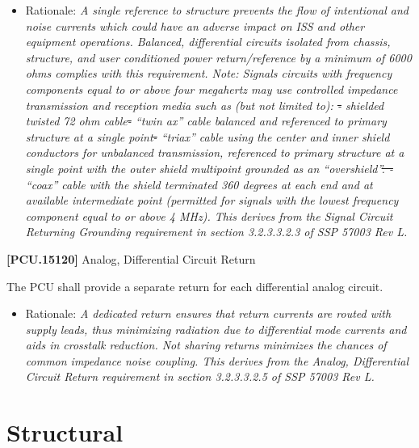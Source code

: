\documentclass[12pt,oneside,oldfontcommands]{memoir}
\providecommand{\DIFaddtex}[1]{{\protect\color{blue}\uwave{#1}}} %
\providecommand{\DIFdeltex}[1]{{\protect\color{red}\sout{#1}}}                      %
\providecommand{\DIFaddbegin}{} %
\providecommand{\DIFaddend}{} %
\providecommand{\DIFdelbegin}{} %
\providecommand{\DIFdelend}{} %
\providecommand{\DIFadd}[1]{\texorpdfstring{\DIFaddtex{#1}}{#1}} %
\providecommand{\DIFdel}[1]{\texorpdfstring{\DIFdeltex{#1}}{}} %
\newcommand{\DIFscaledelfig}{0.5}
\newlength{\DIFdelgraphicswidth} %
\newlength{\DIFdelgraphicsheight} %
\newcommand{\DIFaddincludegraphics}[2][]{{\color{blue}\fbox{\DIFOincludegraphics[#1]{#2}}}} %
\newcommand{\DIFdelincludegraphics}[2][]{%
\sbox{\DIFdelgraphicsbox}{\DIFOincludegraphics[#1]{#2}}%
\settoboxwidth{\DIFdelgraphicswidth}{\DIFdelgraphicsbox} %
\settoboxtotalheight{\DIFdelgraphicsheight}{\DIFdelgraphicsbox} %
\scalebox{\DIFscaledelfig}{%
\parbox[b]{\DIFdelgraphicswidth}{\usebox{\DIFdelgraphicsbox}\\[-\baselineskip] \rule{\DIFdelgraphicswidth}{0em}}\llap{\resizebox{\DIFdelgraphicswidth}{\DIFdelgraphicsheight}{%
\setlength{\unitlength}{\DIFdelgraphicswidth}%
\begin{picture}(1,1)%
\thicklines\linethickness{2pt} %
{\color[rgb]{1,0,0}\put(0,0){\framebox(1,1){}}}%
{\color[rgb]{1,0,0}\put(0,0){\line( 1,1){1}}}%
{\color[rgb]{1,0,0}\put(0,1){\line(1,-1){1}}}%
\end{picture}%
}\hspace*{3pt}}} %
} %
\DeclareRobustCommand{\DIFaddbegin}{\DIFOaddbegin \let\includegraphics\DIFaddincludegraphics} %
\DeclareRobustCommand{\DIFaddend}{\DIFOaddend \let\includegraphics\DIFOincludegraphics} %
\DeclareRobustCommand{\DIFdelbegin}{\DIFOdelbegin \let\includegraphics\DIFdelincludegraphics} %
\DeclareRobustCommand{\DIFdelend}{\DIFOaddend \let\includegraphics\DIFOincludegraphics} %
\begin{document}
\begin{itemize}
\item{} Rationale: \emph{A single reference to structure prevents the flow of intentional and noise currents which could have an adverse impact on ISS and other equipment operations. Balanced, differential circuits isolated from chassis, structure, and user conditioned power return\slash reference by a minimum of 6000 ohms complies with this requirement. Note: Signals circuits with frequency components equal to or above four megahertz may use controlled impedance transmission and reception media such as (but not limited to): \DIFdelbegin \DIFdel{- }\DIFdelend \DIFaddbegin \DIFadd{1) }\DIFaddend shielded twisted 72 ohm cable\DIFdelbegin \DIFdel{- }\DIFdelend \DIFaddbegin \DIFadd{; 2) }\DIFaddend ``twin ax'' cable balanced and referenced to primary structure at a single point\DIFdelbegin \DIFdel{- }\DIFdelend \DIFaddbegin \DIFadd{; 3) }\DIFaddend ``triax'' cable using the center and inner shield conductors for unbalanced transmission, referenced to primary structure at a single point with the outer shield multipoint grounded as an ``overshield''\DIFdelbegin \DIFdel{. - }\DIFdelend \DIFaddbegin \DIFadd{; or 4) }\DIFaddend ``coax'' cable with the shield terminated 360 degrees at each end and at available intermediate point (permitted for signals with the lowest frequency component equal to or above 4 MHz). This derives from the Signal Circuit Returning Grounding requirement in section 3.2.3.3.2.3 of SSP 57003 Rev L.}

\end{itemize}

\textbf{[PCU.15120]} Analog, Differential Circuit Return

The \gls{PCU} shall provide a separate return for each differential analog circuit.

\begin{itemize}
\item{} Rationale: \emph{A dedicated return ensures that return currents are routed with supply leads, thus minimizing radiation due to differential mode currents and aids in crosstalk reduction. Not sharing returns minimizes the chances of common impedance noise coupling. This derives from the Analog, Differential Circuit Return requirement in section 3.2.3.3.2.5 of SSP 57003 Rev L.}

\end{itemize}

\section{Structural}
\label{structural}
\end{document}
